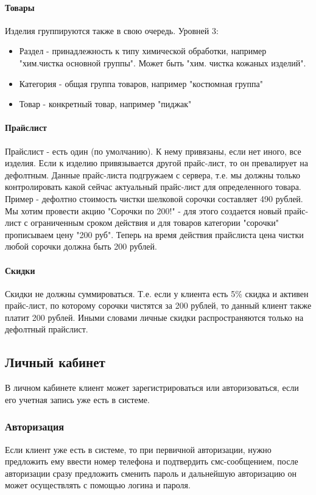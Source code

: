 \documentclass[DIV=calc, paper=a4, fontsize=11pt]{scrartcl} %
\begin{document}
\paragraph{Товары}\label{paragraph:goods}
Изделия группируются также в свою очередь. Уровней 3:
\begin{itemize}
	\item Раздел - принадлежность к типу химической обработки, например "хим.чистка основной группы". Может быть "хим. чистка кожаных изделий".
	\item Категория - общая группа товаров, например "костюмная группа"
	\item Товар - конкретный товар, например "пиджак"
\end{itemize}

\paragraph{Прайслист}
Прайслист - есть один (по умолчанию). К нему привязаны, если нет иного, все изделия. Если к изделию привязывается другой прайс-лист, то он превалирует на дефолтным. Данные прайс-листа подгружаем с сервера, т.е. мы должны только контролировать какой сейчас актуальный прайс-лист для определенного товара.
\\[0.5cm]
Пример - дефолтно стоимость чистки шелковой сорочки составляет 490 рублей. Мы хотим провести акцию "Сорочки по 200!" - для этого создается новый прайс-лист с ограниченным сроком действия и для товаров категории "сорочки" прописываем цену "200 руб". Теперь на время действия прайслиста цена чистки любой сорочки должна быть 200 рублей.

\paragraph{Скидки}
Скидки не должны суммироваться. Т.е. если у клиента есть 5\% скидка и активен прайс-лист, по которому сорочки чистятся за 200 рублей, то данный клиент также платит 200 рублей. Иными словами личные скидки распространяются только на дефолтный прайслист.


\subsection{Личный кабинет}
В личном кабинете клиент может зарегистрироваться или авторизоваться, если его учетная запись уже есть в системе.

\subsubsection{Авторизация}
Если клиент уже есть в системе, то при первичной авторизации, нужно предложить ему ввести номер телефона и подтвердить смс-сообщением, после авторизации сразу предложить сменить пароль и дальнейшую авторизацию он может осуществлять с помощью логина и пароля.
\end{document}
